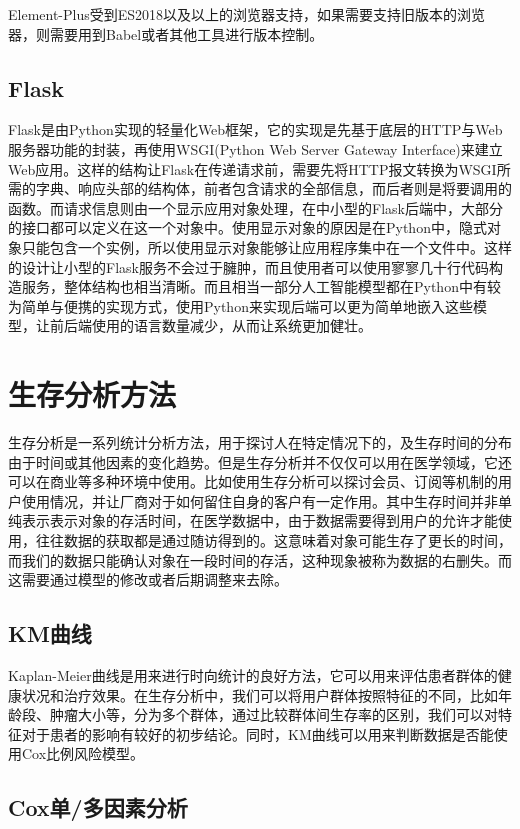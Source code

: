 Element-Plus受到ES2018以及以上的浏览器支持，如果需要支持旧版本的浏览器，则需要用到Babel或者其他工具进行版本控制。

\subsection{Flask}

Flask是由Python实现的轻量化Web框架，它的实现是先基于底层的HTTP与Web服务器功能的封装，再使用WSGI(Python Web Server Gateway Interface)来建立Web应用。这样的结构让Flask在传递请求前，需要先将HTTP报文转换为WSGI所需的字典、响应头部的结构体，前者包含请求的全部信息，而后者则是将要调用的函数。而请求信息则由一个显示应用对象处理，在中小型的Flask后端中，大部分的接口都可以定义在这一个对象中。使用显示对象的原因是在Python中，隐式对象只能包含一个实例，所以使用显示对象能够让应用程序集中在一个文件中。这样的设计让小型的Flask服务不会过于臃肿，而且使用者可以使用寥寥几十行代码构造服务，整体结构也相当清晰。而且相当一部分人工智能模型都在Python中有较为简单与便携的实现方式，使用Python来实现后端可以更为简单地嵌入这些模型，让前后端使用的语言数量减少，从而让系统更加健壮。

\section{生存分析方法}

生存分析是一系列统计分析方法，用于探讨人在特定情况下的，及生存时间的分布由于时间或其他因素的变化趋势。但是生存分析并不仅仅可以用在医学领域，它还可以在商业等多种环境中使用。比如使用生存分析可以探讨会员、订阅等机制的用户使用情况，并让厂商对于如何留住自身的客户有一定作用。其中生存时间并非单纯表示表示对象的存活时间，在医学数据中，由于数据需要得到用户的允许才能使用，往往数据的获取都是通过随访得到的。这意味着对象可能生存了更长的时间，而我们的数据只能确认对象在一段时间的存活，这种现象被称为数据的右删失。而这需要通过模型的修改或者后期调整来去除。

\subsection{KM曲线}

Kaplan-Meier曲线是用来进行时向统计的良好方法，它可以用来评估患者群体的健康状况和治疗效果。在生存分析中，我们可以将用户群体按照特征的不同，比如年龄段、肿瘤大小等，分为多个群体，通过比较群体间生存率的区别，我们可以对特征对于患者的影响有较好的初步结论。同时，KM曲线可以用来判断数据是否能使用Cox比例风险模型。

\subsection{Cox单/多因素分析}

